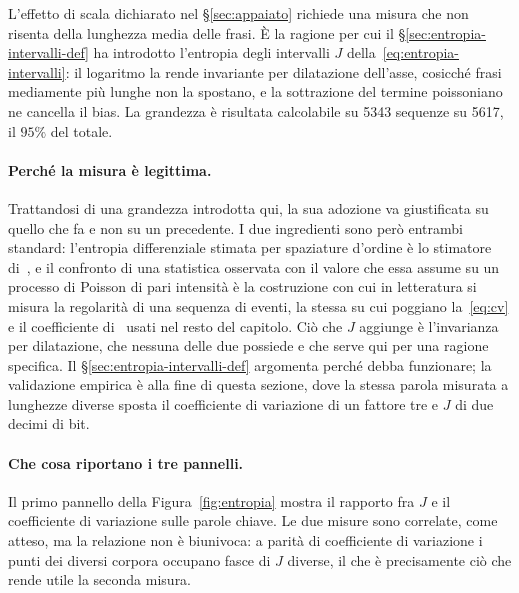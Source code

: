 L'effetto di scala dichiarato nel §\ref{sec:appaiato} richiede una misura che
non risenta della lunghezza media delle frasi. È la ragione per cui il
§\ref{sec:entropia-intervalli-def} ha introdotto l'entropia degli intervalli
$J$ della~\eqref{eq:entropia-intervalli}: il logaritmo la rende invariante per
dilatazione dell'asse, cosicché frasi mediamente più lunghe non la spostano, e
la sottrazione del termine poissoniano ne cancella il bias. La grandezza è
risultata calcolabile su \num{5343} sequenze su \num{5617}, il $95\%$ del
totale.

\paragraph{Perché la misura è legittima.}
Trattandosi di una grandezza introdotta qui, la sua adozione va giustificata su
quello che fa e non su un precedente. I due ingredienti sono però entrambi
standard: l'entropia differenziale stimata per spaziature d'ordine è lo
stimatore di~\cite{vasicek1976}, e il confronto di una statistica osservata con
il valore che essa assume su un processo di Poisson di pari intensità è la
costruzione con cui in letteratura si misura la regolarità di una sequenza di
eventi, la stessa su cui poggiano la~\eqref{eq:cv} e il coefficiente
di~\cite{goh2008} usati nel resto del capitolo. Ciò che $J$ aggiunge è
l'invarianza per dilatazione, che nessuna delle due possiede e che serve qui per
una ragione specifica. Il §\ref{sec:entropia-intervalli-def} argomenta perché
debba funzionare; la validazione empirica è alla fine di questa sezione, dove la
stessa parola misurata a lunghezze diverse sposta il coefficiente di variazione
di un fattore tre e $J$ di due decimi di bit.

\paragraph{Che cosa riportano i tre pannelli.}
Il primo pannello della Figura~\ref{fig:entropia} mostra il rapporto fra $J$ e
il coefficiente di variazione sulle parole chiave. Le due misure sono
correlate, come atteso, ma la relazione non è biunivoca: a parità di
coefficiente di variazione i punti dei diversi corpora occupano fasce di $J$
diverse, il che è precisamente ciò che rende utile la seconda misura.

